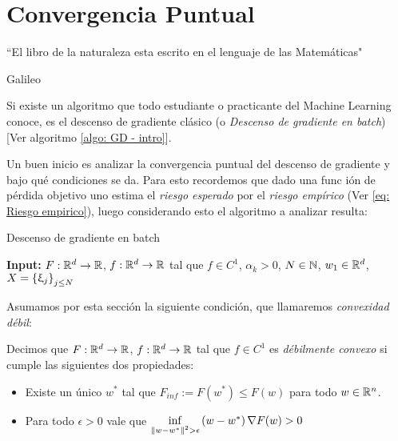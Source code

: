 \chapter{Convergencia Puntual }\label{ch:convergenciaPuntual}

\epigraph{“El libro de la naturaleza esta escrito en el lenguaje de las Matem\'aticas"}{Galileo}

Si existe un algoritmo que todo estudiante o practicante del Machine Learning conoce, es el descenso de gradiente cl\'asico (o \textit{Descenso de gradiente en batch}) [Ver algoritmo \ref{algo: GD - intro}].

Un buen inicio es analizar la convergencia puntual del descenso de gradiente y bajo qu\'e condiciones se da. Para esto recordemos que dado una func i\'on de p\'erdida objetivo uno estima el \textit{riesgo esperado} por el \textit{riesgo emp\'irico} (Ver \ref{eq: Riesgo empirico}), luego considerando esto el algoritmo a analizar resulta:

\LinesNumbered
\begin{algorithm}[H]
	\caption{Descenso de gradiente en batch \label{algo: GD}}
	\textbf{Input:} $F: {\mathbb{R}}^d \rightarrow {\mathbb{R}}$, $f:{\mathbb{R}}^d \rightarrow {\mathbb{R}}$ tal que $f \in C^1$, $\alpha_k >0$, $N \in {\mathbb{N}}$, $w_1 \in {\mathbb{R}}^d$, $X = \left\lbrace\upxi_j\right\rbrace_{j \leq N}$  \\
\end{algorithm}

Asumamos por esta secci\'on la siguiente condici\'on, que llamaremos \textit{convexidad d\'ebil}:

\begin{definition}
	\label{def: Debilmente convexo}
	Decimos que $F: {\mathbb{R}}^d \rightarrow {\mathbb{R}}$, $f:{\mathbb{R}}^d \rightarrow {\mathbb{R}}$ tal que $f \in C^1$ es \textit{d\'ebilmente convexo} si cumple las siguientes dos propiedades:
	
	\begin{itemize}
		\item Existe un \'unico $w^*$ tal que $F_{inf} := F(w^*) \leq F(w)$ para todo $w \in {\mathbb{R}}^n$.
		\item Para todo $\epsilon > 0$ vale que $\inf\limits_{\left\lVert w-w^*\right\rVert^2 > \epsilon} {\left(w - w^*\right) \nabla F(w) > 0}$
	\end{itemize}
	
\end{definition}

